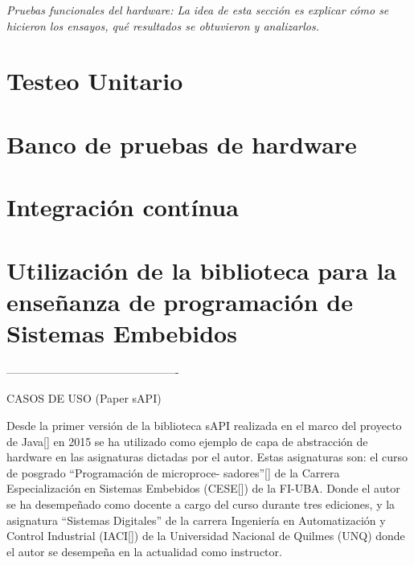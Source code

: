 \emph{Pruebas funcionales del hardware: La idea de esta sección es explicar cómo se hicieron los ensayos, qué resultados se obtuvieron y analizarlos.}

\section{Testeo Unitario}
\label{sec:unitTest}


\section{Banco de pruebas de hardware}
\label{sec:testBench}


\section{Integración contínua}
\label{sec:ci}


\section{Utilización de la biblioteca para la enseñanza de programación de Sistemas Embebidos}
\label{sec:teach}


----------------------------------------------

CASOS DE USO (Paper sAPI)

Desde la primer versión de la biblioteca sAPI realizada en el marco del proyecto de Java[] en 2015 se ha utilizado como ejemplo de capa de abstracción de hardware en las asignaturas dictadas por el autor. Estas asignaturas son: el  curso de posgrado “Programación de microproce- sadores”[] de la Carrera Especialización en Sistemas Embebidos (CESE[]) de la FI-UBA. Donde el autor se ha desempeñado como docente a cargo del curso durante tres ediciones, y la asignatura “Sistemas Digitales” de la carrera Ingeniería en Automatización y Control Industrial (IACI[]) de la Universidad Nacional de Quilmes (UNQ) donde el autor se desempeña en la actualidad como instructor.

